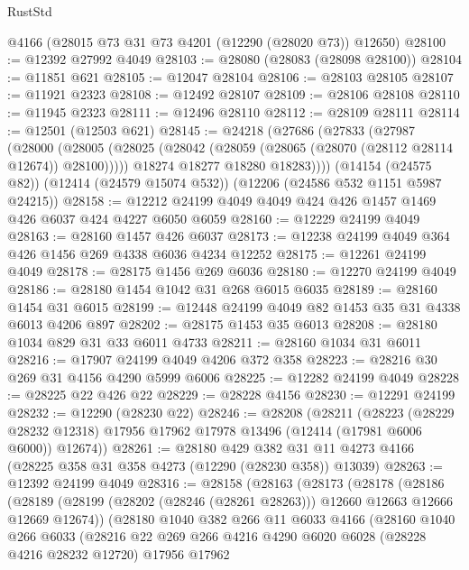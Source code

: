 \begin{lexlean}{RustStd}
\begin{coremodule}
{\begin{coremodule}
{{{{{{{{{{{{{{{{{{{{{{{{{{{{{{{{{{{{{{{{{{{{{{{{{{    @4166
    (@28015 @73 @31 @73 @4201 (@12290 (@28020 @73)) @12650)
@28100 := @12392 @27992 @4049
@28103 := @28080 (@28083 (@28098 @28100))
@28104 := @11851 @621
@28105 := @12047 @28104
@28106 := @28103 @28105
@28107 := @11921 @2323
@28108 := @12492 @28107
@28109 := @28106 @28108
@28110 := @11945 @2323
@28111 := @12496 @28110
@28112 := @28109 @28111
@28114 := @12501 (@12503 @621)
@28145 := @24218
    (@27686
      (@27833
        (@27987
          (@28000
            (@28005 (@28025 (@28042 (@28059 (@28065 (@28070 (@28112 @28114 @12674)) @28100)))))
            @18274
            @18277
            @18280
            @18283))))
    (@14154 (@24575 @82))
    (@12414 (@24579 @15074 @532))
    (@12206 (@24586 @532 @1151 @5987 @24215))
@28158 := @12212 @24199 @4049 @4049 @424 @426 @1457 @1469 @426 @6037 @424 @4227 @6050 @6059
@28160 := @12229 @24199 @4049
@28163 := @28160 @1457 @426 @6037
@28173 := @12238 @24199 @4049 @364 @426 @1456 @269 @4338 @6036 @4234 @12252
@28175 := @12261 @24199 @4049
@28178 := @28175 @1456 @269 @6036
@28180 := @12270 @24199 @4049
@28186 := @28180 @1454 @1042 @31 @268 @6015 @6035
@28189 := @28160 @1454 @31 @6015
@28199 := @12448 @24199 @4049 @82 @1453 @35 @31 @4338 @6013 @4206 @897
@28202 := @28175 @1453 @35 @6013
@28208 := @28180 @1034 @829 @31 @33 @6011 @4733
@28211 := @28160 @1034 @31 @6011
@28216 := @17907 @24199 @4049 @4206 @372 @358
@28223 := @28216 @30 @269 @31 @4156 @4290 @5999 @6006
@28225 := @12282 @24199 @4049
@28228 := @28225 @22 @426 @22
@28229 := @28228 @4156
@28230 := @12291 @24199
@28232 := @12290 (@28230 @22)
@28246 := @28208
    (@28211
      (@28223
        (@28229 @28232 @12318)
        @17956
        @17962
        @17978
        @13496
        (@12414 (@17981 @6006 @6000))
        @12674))
@28261 := @28180
    @429
    @382
    @31
    @11
    @4273
    @4166
    (@28225 @358 @31 @358 @4273 (@12290 (@28230 @358)) @13039)
@28263 := @12392 @24199 @4049
@28316 := @28158
    (@28163
      (@28173
        (@28178
          (@28186
            (@28189 (@28199 (@28202 (@28246 (@28261 @28263))) @12660 @12663 @12666 @12669 @12674))
            (@28180
              @1040
              @382
              @266
              @11
              @6033
              @4166
              (@28160
                @1040
                @266
                @6033
                (@28216
                  @22
                  @269
                  @266
                  @4216
                  @4290
                  @6020
                  @6028
                  (@28228 @4216 @28232 @12720)
                  @17956
                  @17962
}}}}}}}}}}}}}}}}}}}}}}}}}}}}}}}}}}}}}}}}}}}}}}}}}}
\end{coremodule}}
\end{coremodule}
\end{lexlean}
